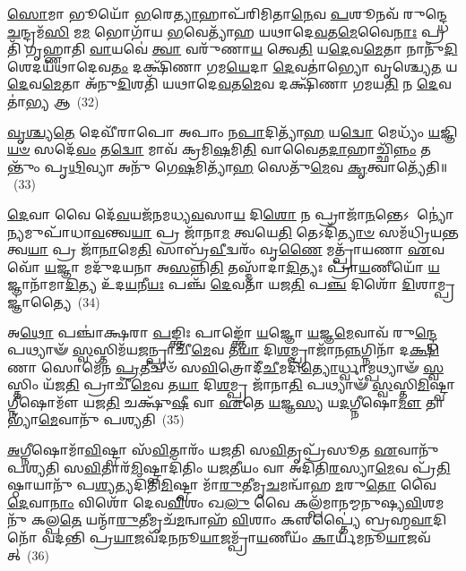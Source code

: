 \-\ul{𑌸𑍋}\-𑌮𑌾 𑌭𑍂𑌯𑍋᳴ \ul{𑌭}\-𑌰𑍇\-\ul{𑌤𑍍𑌯𑌾}\-𑌹𑌾𑌪᳴𑌰𑌿𑌮𑌿𑌤𑌾\-\ul{𑌨𑍇}\-𑌵 \ul{𑌪}\-𑌶𑍂𑌨𑌵᳴ 𑌰𑍁𑌨𑍍𑌦𑍍𑌧𑍇 \ul{𑌚}\-𑌨𑍍𑌦𑍍𑌰𑌮᳴\-\ul{𑌸𑌿} 𑌮\-\ul{𑌮} 𑌭𑍋𑌗𑌾᳴𑌯 \ul{𑌭}\-𑌵𑍇𑌤𑍍𑌯𑌾᳴𑌹 𑌯𑌥𑌾𑌦𑍇\-\ul{𑌵}\-𑌤\-\ul{𑌮𑍇}\-𑌵𑍈\-\ul{𑌨𑌾𑌃} 𑌪𑍍𑌰𑌤𑌿᳴ 𑌗𑍃𑌹𑍍𑌣𑌾𑌤𑌿 \ul{𑌵𑌾}\-𑌯𑌵𑍇॑ \ul{𑌤𑍍𑌵𑌾} 𑌵𑌰𑍁᳴𑌣𑌾\-\ul{𑌯} 𑌤𑍍𑌵𑍇\-\ul{𑌤𑌿} 𑌯\-\ul{𑌦𑍇}\-𑌵\-\ul{𑌮𑍇}\-𑌤𑌾 𑌨𑌾𑌨𑍁᳴\-\ul{𑌦𑌿}\-𑌶𑍇𑌦𑌯᳴𑌥𑌾𑌦𑍇𑌵\-\ul{𑌤𑌂} 𑌦𑌕𑍍𑌷𑌿᳴𑌣𑌾 𑌗𑌮\-\ul{𑌯𑍇}\-𑌦𑌾 \ul{𑌦𑍇}\-𑌵𑌤𑌾॑𑌭𑍍𑌯𑍋 𑌵𑍃𑌶𑍍𑌚𑍍𑌯𑍇\-\ul{𑌤} 𑌯\-\ul{𑌦𑍇}\-𑌵\-\ul{𑌮𑍇}\-𑌤𑌾 𑌅᳴𑌨𑍁\-\ul{𑌦𑌿}\-𑌶𑌤𑌿᳴ 𑌯𑌥𑌾𑌦𑍇\-\ul{𑌵}\-𑌤\-\ul{𑌮𑍇}\-𑌵 𑌦𑌕𑍍𑌷𑌿᳴𑌣𑌾 𑌗𑌮𑌯\-\ul{𑌤𑌿} 𑌨 \ul{𑌦𑍇}\-𑌵𑌤𑌾॑\-\ul{𑌭𑍍𑌯} 𑌆~(32)

\-\ul{𑌵𑍃}\-\-\ul{𑌶𑍍𑌚𑍍𑌯}\-\-\ul{𑌤𑍇} 𑌦𑍇𑌵𑍀᳴𑌰𑌾𑌪𑍋 𑌅𑌪𑌾𑌂 𑌨\-\ul{𑌪𑌾}\-𑌦𑌿𑌤𑍍𑌯𑌾᳴\-\ul{𑌹} 𑌯\-\ul{𑌦𑍍𑌵𑍋} 𑌮𑍇𑌧𑍍𑌯𑌂᳴ \ul{𑌯}\-𑌜𑍍𑌞𑌿\-\ul{𑌯}\-\-\ul{𑍞} 𑌸𑌦𑍇᳴\-\ul{𑌵𑌂} 𑌤\-\ul{𑌦𑍍𑌵𑍋} 𑌮𑌾𑌵᳴ 𑌕𑍍𑌰𑌮𑌿\-\ul{𑌷}\-𑌮𑌿\-\ul{𑌤𑌿} 𑌵𑌾𑌵𑍈𑌤\-\ul{𑌦𑌾}\-𑌹𑌾𑌚𑍍𑌛𑌿᳴\-\ul{𑌨𑍍𑌨𑌂} 𑌤𑌨𑍍𑌤𑍁𑌂᳴ 𑌪𑍃\-\ul{𑌥𑌿}\-𑌵𑍍𑌯𑌾 𑌅𑌨𑍁᳴ 𑌗𑍇\-\ul{𑌷}\-𑌮𑌿𑌤𑍍𑌯𑌾᳴\-\ul{𑌹} 𑌸𑍇𑌤𑍁᳴\-\ul{𑌮𑍇}\-𑌵 \ul{𑌕𑍃}\-𑌤𑍍𑌵𑌾𑌤𑍍𑌯𑍇᳴𑌤𑌿॥~(33)

{}%

\-\ul{𑌦𑍇}\-𑌵𑌾 𑌵𑍈 𑌦𑍇᳴\-\ul{𑌵}\-𑌯𑌜᳴𑌨𑌮𑌧𑍍𑌯\-\ul{𑌵}\-𑌸𑌾\-\ul{𑌯} 𑌦𑌿\-\ul{𑌶𑍋} 𑌨 𑌪𑍍𑌰𑌾𑌜𑌾᳴\-\ul{𑌨}\-𑌨𑍍𑌤𑍇\-𑌽 𑌨𑍍𑌯𑍋॑𑌨𑍍𑌯𑌮𑍁𑌪𑌾᳴𑌧𑌾\-\ul{𑌵}\-𑌨𑍍𑌤𑍍𑌵\-\ul{𑌯𑌾} 𑌪𑍍𑌰 𑌜𑌾᳴𑌨𑌾\-\ul{𑌮} 𑌤𑍍𑌵𑌯𑍇\-\ul{𑌤𑌿} 𑌤𑍇\-𑌽𑌦𑌿᳴\-\ul{𑌤𑍍𑌯𑌾}\-\-\ul{𑍞} 𑌸𑌮᳴𑌧𑍍𑌰𑌿𑌯\-\ul{𑌨𑍍𑌤} 𑌤𑍍𑌵\-\ul{𑌯𑌾} 𑌪𑍍𑌰 𑌜𑌾᳴\-\ul{𑌨𑌾}\-𑌮𑍇\-\ul{𑌤𑌿} 𑌸𑌾𑌬𑍍𑌰᳴\-\ul{𑌵𑍀}\-𑌦𑍍𑌵𑌰𑌂᳴ 𑌵𑍃\-\ul{𑌣𑍈} 𑌮𑌤𑍍𑌪𑍍𑌰𑌾᳴𑌯𑌣𑌾 \ul{𑌏}\-𑌵 𑌵𑍋᳴ \ul{𑌯}\-𑌜𑍍𑌞𑌾 𑌮𑌦𑍁᳴𑌦𑌯𑌨𑌾 𑌅\-\ul{𑌸}\-𑌨𑍍𑌨𑌿\-\ul{𑌤𑌿} 𑌤𑌸𑍍𑌮𑌾᳴𑌦𑌾\-\ul{𑌦𑌿}\-𑌤𑍍𑌯𑌃 𑌪𑍍𑌰𑌾᳴\-\ul{𑌯}\-𑌣𑍀𑌯𑍋᳴ \ul{𑌯}\-𑌜𑍍𑌞𑌾𑌨𑌾᳴𑌮𑌾\-\ul{𑌦𑌿}\-𑌤𑍍𑌯 𑌉᳴𑌦\-\ul{𑌯}\-𑌨𑍀\-\ul{𑌯𑌃} 𑌪𑌞𑍍𑌚᳴ \ul{𑌦𑍇}\-𑌵𑌤𑌾᳴ 𑌯𑌜\-\ul{𑌤𑌿} 𑌪\-\ul{𑌞𑍍𑌚} 𑌦𑌿𑌶𑍋᳴ \ul{𑌦𑌿}\-𑌶𑌾𑌮𑍍𑌪𑍍𑌰𑌜𑍍𑌞𑌾॑𑌤𑍍𑌯𑍈~(34)

𑌅\-\ul{𑌥𑍋} 𑌪𑌞𑍍𑌚𑌾॑𑌕𑍍𑌷𑌰𑌾 \ul{𑌪}\-𑌙𑍍𑌕𑍍𑌤𑌿𑌃 𑌪𑌾𑌙𑍍𑌕𑍍𑌤𑍋᳴ \ul{𑌯}\-𑌜𑍍𑌞𑍋 \ul{𑌯}\-𑌜𑍍𑌞\-\ul{𑌮𑍇}\-𑌵𑌾𑌵᳴ 𑌰𑍁\-\ul{𑌨𑍍𑌦𑍍𑌧𑍇} 𑌪𑌥𑍍𑌯𑌾𑍟᳴ \ul{𑌸𑍍𑌵}\-𑌸𑍍𑌤𑌿𑌮᳴𑌯\-\ul{𑌜}\-𑌨𑍍𑌪𑍍𑌰𑌾𑌚𑍀᳴\-\ul{𑌮𑍇}\-𑌵 𑌤\-\ul{𑌯𑌾} 𑌦𑌿\-\ul{𑌶}\-𑌮𑍍𑌪𑍍𑌰𑌾𑌜𑌾᳴𑌨\-\ul{𑌨𑍍𑌨}\-𑌗𑍍𑌨𑌿𑌨𑌾᳴ 𑌦\-\ul{𑌕𑍍𑌷𑌿}\-𑌣𑌾 𑌸𑍋𑌮𑍇᳴𑌨 \ul{𑌪𑍍𑌰}\-𑌤𑍀𑌚𑍀𑍞᳴ 𑌸\-\ul{𑌵𑌿}\-𑌤𑍍𑌰𑍋𑌦𑍀᳴\-\ul{𑌚𑍀}\-𑌮𑌦𑌿᳴\-\ul{𑌤𑍍𑌯𑍋}\-𑌰𑍍𑌧𑍍𑌵𑌾𑌮𑍍𑌪𑌥𑍍𑌯𑌾𑍟᳴ \ul{𑌸𑍍𑌵}\-𑌸𑍍𑌤𑌿𑌂 𑌯᳴𑌜\-\ul{𑌤𑌿} 𑌪𑍍𑌰𑌾𑌚𑍀᳴\-\ul{𑌮𑍇}\-𑌵 𑌤\-\ul{𑌯𑌾} 𑌦𑌿\-\ul{𑌶}\-𑌮𑍍𑌪𑍍𑌰 𑌜𑌾᳴𑌨𑌾\-\ul{𑌤𑌿} 𑌪𑌥𑍍𑌯𑌾𑍟᳴ \ul{𑌸𑍍𑌵}\-𑌸𑍍𑌤𑌿\-\ul{𑌮𑌿}\-𑌷𑍍𑌟𑍍𑌵𑌾𑌗𑍍𑌨𑍀𑌷𑍋𑌮𑍗᳴ 𑌯𑌜\-\ul{𑌤𑌿} 𑌚𑌕𑍍𑌷𑍁᳴\-\ul{𑌷𑍀} 𑌵𑌾 \ul{𑌏}\-𑌤𑍇 \ul{𑌯}\-𑌜𑍍𑌞\-\ul{𑌸𑍍𑌯} 𑌯\-\ul{𑌦}\-𑌗𑍍𑌨𑍀𑌷𑍋\-\ul{𑌮𑍗} 𑌤𑌾𑌭𑍍𑌯𑌾᳴\-\ul{𑌮𑍇}\-𑌵𑌾𑌨𑍁᳴ 𑌪𑌶𑍍𑌯𑌤𑌿~(35)

\-\ul{𑌅}\-𑌗𑍍𑌨𑍀𑌷𑍋𑌮𑌾᳴\-\ul{𑌵𑌿}\-𑌷𑍍𑌟𑍍𑌵𑌾 𑌸᳴\-\ul{𑌵𑌿}\-𑌤𑌾𑌰𑌂᳴ 𑌯𑌜𑌤𑌿 𑌸\-\ul{𑌵𑌿}\-𑌤𑍃𑌪𑍍𑌰᳴𑌸𑍂𑌤 \ul{𑌏}\-𑌵𑌾𑌨𑍁᳴ 𑌪𑌶𑍍𑌯𑌤𑌿 𑌸\-\ul{𑌵𑌿}\-𑌤𑌾𑌰᳴\-\ul{𑌮𑌿}\-𑌷𑍍𑌟𑍍𑌵𑌾𑌦𑌿᳴𑌤𑌿𑌂 𑌯𑌜\-\ul{𑌤𑍀}\-𑌯𑌂 𑌵𑌾 𑌅𑌦𑌿᳴𑌤𑌿\-\ul{𑌰}\-𑌸𑍍𑌯𑌾\-\ul{𑌮𑍇}\-𑌵 𑌪𑍍𑌰᳴\-\ul{𑌤𑌿}\-𑌷𑍍𑌠𑌾𑌯𑌾𑌨𑍁᳴ 𑌪\-\ul{𑌶𑍍𑌯}\-𑌤𑍍𑌯𑌦𑌿᳴𑌤𑌿\-\ul{𑌮𑌿}\-𑌷𑍍𑌟𑍍𑌵𑌾 𑌮𑌾᳴\-\ul{𑌰𑍁}\-𑌤𑍀𑌮𑍃\-\ul{𑌚}\-𑌮𑌨𑍍𑌵𑌾᳴𑌹 \ul{𑌮}\-𑌰𑍁\-\ul{𑌤𑍋} 𑌵𑍈 \ul{𑌦𑍇}\-𑌵𑌾\-\ul{𑌨𑌾𑌂} 𑌵𑌿𑌶𑍋᳴ 𑌦𑍇𑌵\-\ul{𑌵𑌿}\-𑌶𑌂 𑌖\-\ul{𑌲𑍁} 𑌵𑍈 𑌕𑌲𑍍𑌪᳴𑌮𑌾𑌨𑌮𑍍𑌮𑌨𑍁𑌷𑍍𑌯\-\ul{𑌵𑌿}\-𑌶\-𑌮𑌨𑍁᳴ 𑌕𑌲𑍍𑌪\-\ul{𑌤𑍇} 𑌯𑌨𑍍𑌮𑌾᳴\-\ul{𑌰𑍁}\-𑌤𑍀𑌮𑍃𑌚᳴\-\ul{𑌮}\-𑌨𑍍𑌵𑌾𑌹᳴ \ul{𑌵𑌿}\-𑌶𑌾𑌂 𑌕𑍢𑌪𑍍𑌤𑍍𑌯𑍈॑ 𑌬𑍍𑌰𑌹𑍍𑌮\-\ul{𑌵𑌾}\-𑌦𑌿𑌨𑍋᳴ 𑌵𑌦𑌨𑍍𑌤𑌿 𑌪𑍍𑌰\-\ul{𑌯𑌾}\-𑌜𑌵᳴𑌦𑌨𑌨𑍂\-\ul{𑌯𑌾}\-𑌜𑌮𑍍𑌪𑍍𑌰𑌾᳴\-\ul{𑌯}\-𑌣𑍀𑌯𑌂᳴ \ul{𑌕𑌾}\-𑌰𑍍𑌯᳴𑌮𑌨𑍂\-\ul{𑌯𑌾}\-𑌜𑌵᳴𑌤𑍍~(36)

